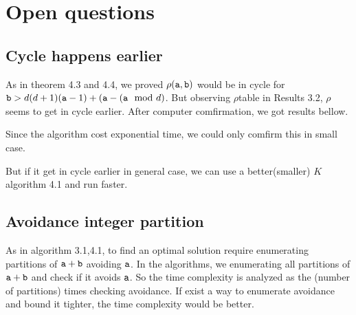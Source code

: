 \section{Open questions}
\subsection{Cycle happens earlier}
    As in theorem 4.3 and 4.4, we proved $\rho(\mathtt{a},\mathtt{b})$ would be in cycle for $\mathtt{b}>d(d+1)(\mathtt{a}-1)+(\mathtt{a}-(\mathtt{a}\mod d)$. But observing $\rho$table in Results 3.2, $\rho$ seems to get in cycle earlier. After computer comfirmation, we got results bellow.
    

    Since the algorithm cost exponential time, we could only comfirm this in small case.
    
    But if it get in cycle earlier in general case, we can use a better(smaller) $K$ algorithm 4.1 and run faster.
\subsection{Avoidance integer partition}
    As in algorithm 3.1,4.1, to find an optimal solution require enumerating partitions of $\mathtt{a}+\mathtt{b}$ avoiding $\mathtt{a}$. In the algorithms, we enumerating all partitions of $\mathtt{a}+\mathtt{b}$ and check if it avoids $\mathtt{a}$. So the time complexity is analyzed as the (number of partitions) times checking avoidance. If exist a way to enumerate avoidance and bound it tighter, the time complexity would be better.